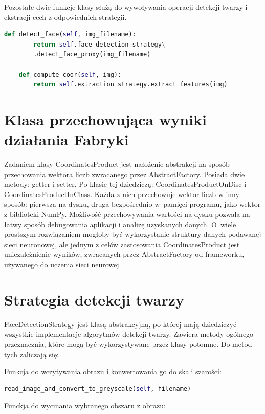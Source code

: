 \documentclass[oneside, eng]{mgr}
\begin{document}
Pozostałe dwie funkcje klasy służą do wywoływania operacji detekcji twarzy i ekstracji cech z odpowiednich strategii.

\begin{lstlisting}[language=Python]
    def detect_face(self, img_filename):
        return self.face_detection_strategy\
        .detect_face_proxy(img_filename)

    def compute_coor(self, img):
        return self.extraction_strategy.extract_features(img)
\end{lstlisting}



\section{Klasa przechowująca wyniki działania Fabryki}

Zadaniem klasy CoordinatesProduct jest nałożenie abstrakcji na sposób przechowania wektora liczb zwracanego przez AbstractFactory. Posiada dwie metody: getter i setter. Po klasie tej dziedziczą: CoordinatesProductOnDisc i CoordinatesProductInClass. Każda z nich przechowuje wektor liczb w inny sposób: pierwsza na dysku, druga bezpośrednio w~pamięci programu, jako wektor z biblioteki NumPy. Możliwość przechowywania wartości na dysku pozwala na łatwy sposób debugowania aplikacji i analizę uzyskanych danych. O~wiele prostszym rozwiązaniem mogłoby być wykorzystanie struktury danych podawanej sieci neuronowej, ale jednym z celów zastosowania CoordinatesProduct jest uniezależnienie wyników, zwracanych przez AbstractFactory od frameworku, używanego do uczenia sieci neurowej.

\section{Strategia detekcji twarzy}

FaceDetectionStrategy jest klasą abstrakcyjną, po której mają dziedziczyć wszystkie implementacje algorytmów detekcji twarzy. Zawiera metody ogólnego przeznacznia, które mogą być wykorzystywane przez klasy potomne. Do metod tych zaliczają się:

Funkcja do wczytywania obrazu i konwertowania go do skali szarości:

\begin{lstlisting}[language=Python]
	read_image_and_convert_to_greyscale(self, filename)
\end{lstlisting}

Funckja do wycinania wybranego obszaru z obrazu:
\end{document}
